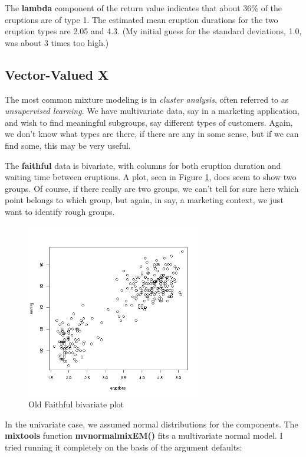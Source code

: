 \documentclass[11pt]{article}
\begin{document}
The \textbf{lambda} component of the return value indicates that about
36\% of the eruptions are of type 1.  The estimated mean eruption
durations for the two eruption types are 2.05 and 4.3.  (My initial
guess for the standard deviations, 1.0, was about 3 times too high.)

\subsection{Vector-Valued X}

The most common mixture modeling is in \textit{cluster analysis}, often
referred to as \textit{unsupervised learning}.  We have multivariate
data, say in a marketing application, and wish to find meaningful
subgroups, say different types of customers.  Again, we don't know what
types are there, if there are any in some sense, but if we can find
some, this may be very useful.

The \textbf{faithful} data is bivariate, with columns for both eruption
duration and waiting time between eruptions.  A plot, seen in Figure
\ref{bivariatefaithful}, does seem to show two groups.  Of course, if
there really are two groups, we can't tell for sure here which point
belongs to which group, but again, in say, a marketing context, we just
want to identify rough groups.  

\begin{figure}[tb]
\centerline{
\includegraphics[width=3.0in]{BivarFaithful.png}
}
\caption{Old Faithful bivariate plot}
\label{bivariatefaithful}
\end{figure}

In the univariate case, we assumed normal distributions for the
components.  The \textbf{mixtools} function \textbf{mvnormalmixEM()} 
fits a multivariate normal model.  I tried running it completely on the
basis of the argument defaults:
\end{document}
